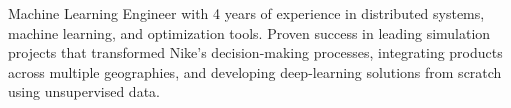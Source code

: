 


\begin{cvparagraph}
Machine Learning Engineer with 4 years of experience in distributed systems, machine learning, and optimization tools. Proven success in leading simulation projects that transformed Nike’s decision-making processes, integrating products across multiple geographies, and developing deep-learning solutions from scratch using unsupervised data.
\end{cvparagraph}
